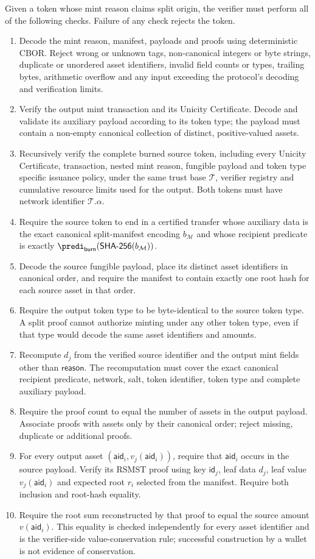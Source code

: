 Given a token whose mint reason claims split origin, the verifier must perform all of the following checks.  Failure of any check rejects the token.
\begin{enumerate}
	\item Decode the mint reason, manifest, payloads and proofs using deterministic CBOR.  Reject wrong or unknown tags, non-canonical integers or byte strings, duplicate or unordered asset identifiers, invalid field counts or types, trailing bytes, arithmetic overflow and any input exceeding the protocol's decoding and verification limits.
	\item Verify the output mint transaction and its Unicity Certificate.  Decode and validate its auxiliary payload according to its token type; the payload must contain a non-empty canonical collection of distinct, positive-valued assets.
	\item Recursively verify the complete burned source token, including every Unicity Certificate, transaction, nested mint reason, fungible payload and token type specific issuance policy, under the same trust base $\mathcal{T}$, verifier registry and cumulative resource limits used for the output.  Both tokens must have network identifier $\mathcal{T}.\alpha$.
	\item Require the source token to end in a certified transfer whose auxiliary data is the exact canonical split-manifest encoding $b_\mathcal{M}$ and whose recipient predicate is exactly $\predi_\mathsf{burn}(\mathsf{SHA\text{-}256}(b_\mathcal{M}))$.
	\item Decode the source fungible payload, place its distinct asset identifiers in canonical order, and require the manifest to contain exactly one root hash for each source asset in that order.
	\item Require the output token type to be byte-identical to the source token type.  A split proof cannot authorize minting under any other token type, even if that type would decode the same asset identifiers and amounts.
	\item Recompute $d_j$ from the verified source identifier and the output mint fields other than $\mathsf{reason}$.  The recomputation must cover the exact canonical recipient predicate, network, salt, token identifier, token type and complete auxiliary payload.
	\item Require the proof count to equal the number of assets in the output payload.  Associate proofs with assets only by their canonical order; reject missing, duplicate or additional proofs.
	\item For every output asset $(\mathsf{aid}_i,v_j(\mathsf{aid}_i))$, require that $\mathsf{aid}_i$ occurs in the source payload.  Verify its RSMST proof using key $\mathsf{id}_j$, leaf data $d_j$, leaf value $v_j(\mathsf{aid}_i)$ and expected root $r_i$ selected from the manifest.  Require both inclusion and root-hash equality.
	\item Require the root sum reconstructed by that proof to equal the source amount $v(\mathsf{aid}_i)$.  This equality is checked independently for every asset identifier and is the verifier-side value-conservation rule; successful construction by a wallet is not evidence of conservation.
\end{enumerate}

